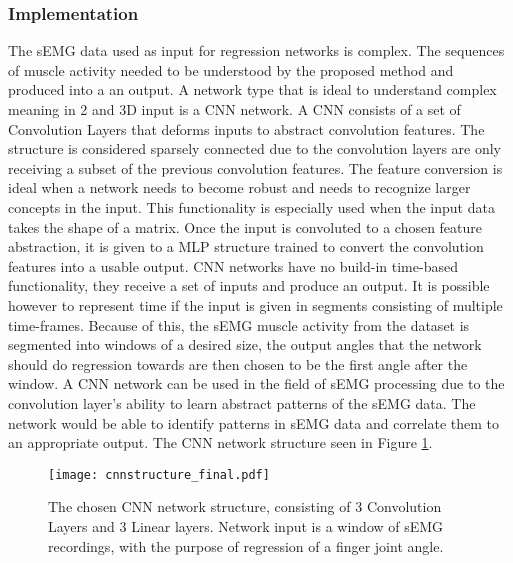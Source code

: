 \documentclass[../main.tex]{subfiles}
\begin{document}
\subsubsection{Implementation}

The sEMG data used as input for regression networks is complex.
The sequences of muscle activity needed to be understood by the proposed method and produced into a an output.
A network type that is ideal to understand complex meaning in 2 and 3D input is a \gls{CNN} network.
A \gls{CNN} consists of a set of Convolution Layers that deforms inputs to abstract convolution features.
The structure is considered sparsely connected due to the convolution layers are only receiving a subset of the previous convolution features.
The feature conversion is ideal when a network needs to become robust and needs to recognize larger concepts in the input.
This functionality is especially used when the input data takes the shape of a matrix.
Once the input is convoluted to a chosen feature abstraction, it is given to a \gls{MLP} structure trained to convert the convolution features into a usable output.
CNN networks have no build-in time-based functionality, they receive a set of inputs and produce an output.
It is possible however to represent time if the input is given in segments consisting of multiple time-frames.
Because of this, the \gls{sEMG} muscle activity from the dataset is segmented into windows of a desired size, the output angles that the network should do regression towards are then chosen to be the first angle after the window.
A CNN network can be used in the field of \gls{sEMG} processing due to the convolution layer's ability to learn abstract patterns of the \gls{sEMG} data.
The network would be able to identify patterns in \gls{sEMG} data and correlate them to an appropriate output.
The \gls{CNN} network structure seen in Figure \ref{fig:cnn_structure}.

\begin{figure}[H]
\begin{center}
\texttt{[image: cnnstructure\_final.pdf]}
\caption{The chosen CNN network structure, consisting of 3 Convolution Layers and 3 Linear layers. Network input is a window of sEMG recordings, with the purpose of regression of a finger joint angle.}
\label{fig:cnn_structure}
\end{center}
\end{figure}
\end{document}
